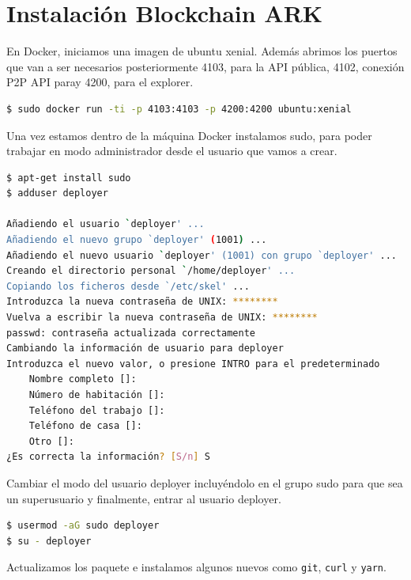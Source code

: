 \section{Instalación Blockchain ARK}

En Docker, iniciamos una imagen de ubuntu xenial. Además abrimos los puertos que van a ser necesarios posteriormente 4103, para la API pública, 4102, conexión P2P API paray 4200, para el explorer.\\

\begin{lstlisting}[language=Bash,caption=Instalación Blockchain. Parte I, label=cod:suma-cuerpo, style=Consola]
$ sudo docker run -ti -p 4103:4103 -p 4200:4200 ubuntu:xenial
\end{lstlisting}

Una vez estamos dentro de la máquina Docker instalamos sudo, para poder trabajar en modo administrador desde el usuario que vamos a crear.\\

\begin{lstlisting}[language=Bash,caption=Instalación Blockchain. Parte II, label=cod:suma-cuerpo, style=Consola]
$ apt-get install sudo
$ adduser deployer

Añadiendo el usuario `deployer' ...
Añadiendo el nuevo grupo `deployer' (1001) ...
Añadiendo el nuevo usuario `deployer' (1001) con grupo `deployer' ...
Creando el directorio personal `/home/deployer' ...
Copiando los ficheros desde `/etc/skel' ...
Introduzca la nueva contraseña de UNIX: ********
Vuelva a escribir la nueva contraseña de UNIX: ********
passwd: contraseña actualizada correctamente
Cambiando la información de usuario para deployer
Introduzca el nuevo valor, o presione INTRO para el predeterminado
	Nombre completo []: 
	Número de habitación []: 
	Teléfono del trabajo []: 
	Teléfono de casa []: 
	Otro []: 
¿Es correcta la información? [S/n] S
\end{lstlisting}

Cambiar el modo del usuario deployer incluyéndolo en el grupo sudo para que sea un superusuario y finalmente, entrar al usuario deployer.\\

\begin{lstlisting}[language=Bash,caption=Instalación Blockchain. Parte III, label=cod:suma-cuerpo, style=Consola]
$ usermod -aG sudo deployer
$ su - deployer
\end{lstlisting}

Actualizamos los paquete e instalamos algunos nuevos como \texttt{git}, \texttt{curl} y \texttt{yarn}.\\

